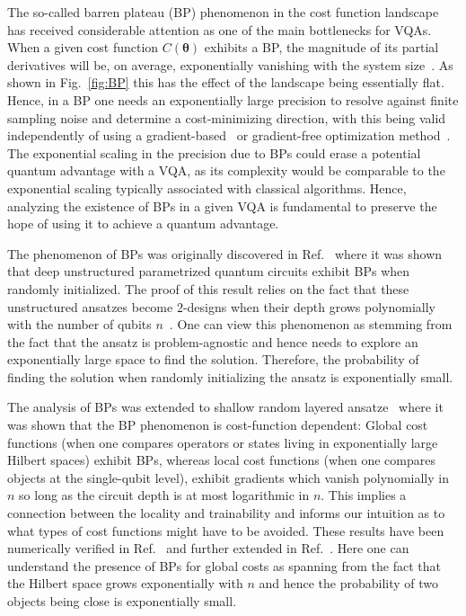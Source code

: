 \documentclass[prx,twocolumn,floatfix,superscriptaddress,longbibliography]{revtex4-1}
\renewcommand{\vec}[1]{\boldsymbol{#1}}  %
\newcommand{\<}{\langle}
\renewcommand{\>}{\rangle}
\renewcommand{\vec}[1]{\boldsymbol{#1}}  %
\begin{document}
The so-called barren plateau (BP) phenomenon in the cost function landscape has received considerable attention as one of the main bottlenecks for VQAs. When a given cost function $C(\vec{\theta})$ exhibits a BP, the magnitude of its partial derivatives will be, on average, exponentially vanishing with the system size~\cite{mcclean2018barren}. As shown in Fig.~\ref{fig:BP} this has the effect of the landscape being essentially flat. Hence, in a BP  one needs an exponentially large precision to  resolve against finite sampling noise and determine a cost-minimizing direction, with this being valid independently of using a gradient-based~\cite{cerezo2020impact} or gradient-free optimization method~\cite{arrasmith2020effect}.  The exponential scaling in the precision due to BPs could erase a potential quantum advantage with a VQA, as its complexity would be comparable to the exponential scaling typically associated with classical algorithms. Hence, analyzing the existence of BPs in a given VQA is fundamental to preserve the hope of using it to achieve a quantum advantage.



The phenomenon of BPs was originally discovered in Ref.~\cite{mcclean2018barren} where it was shown that deep unstructured parametrized quantum circuits exhibit BPs when randomly initialized. The proof of this result relies on the fact that these unstructured ansatzes become $2$-designs when their depth grows polynomially with the number of qubits $n$~\cite{harrow2009random,brandao2016local}. One can view this phenomenon as stemming from the fact that the ansatz is problem-agnostic and hence needs to explore an exponentially large space to find the solution. Therefore, the probability of finding the solution when randomly initializing the ansatz is exponentially small.

The analysis of BPs was extended to shallow random layered ansatze~\cite{cerezo2020cost} where it was shown that the BP phenomenon is cost-function dependent: Global cost functions (when one compares operators or states living in exponentially large Hilbert spaces) exhibit BPs, whereas local cost functions (when one compares objects at the single-qubit level), exhibit gradients which vanish polynomially in $n$ so long as the circuit depth is at most logarithmic in $n$. This implies a connection between the locality and trainability and informs our intuition as to what types of cost functions might have to be avoided. These results have been numerically verified in Ref.~\cite{uvarov2020variational} and further extended in Ref.~\cite{uvarov2020barren}.  Here one can understand the presence of BPs for global costs as spanning from the fact that the Hilbert space grows exponentially with $n$ and hence the probability of two objects being close is exponentially small. 
\end{document}
